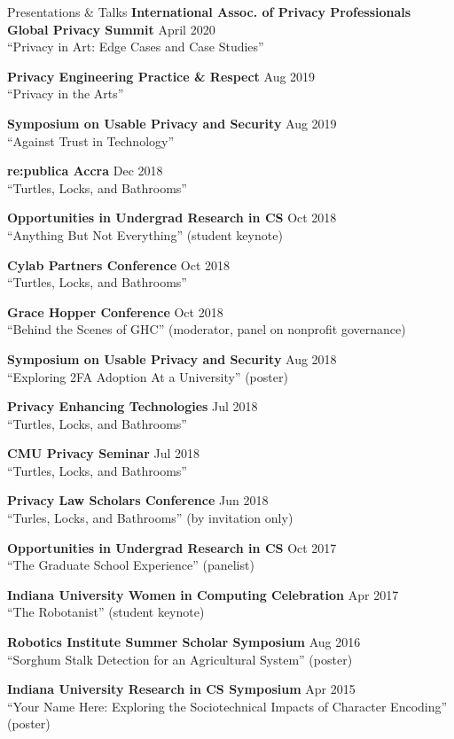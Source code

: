 \documentclass{resume} %
\begin{document}
\begin{rSection}{Presentations \& Talks}
	{\bf International Assoc. of Privacy Professionals Global Privacy Summit} \hfill April 2020 \\
		``Privacy in Art: Edge Cases and Case Studies''
	
	{\bf Privacy Engineering Practice \& Respect} \hfill Aug 2019 \\
		``Privacy in the Arts'' 
		
	{\bf Symposium on Usable Privacy and Security} \hfill Aug 2019 \\
		``Against Trust in Technology'' 
	
	{\bf re:publica Accra} \hfill Dec 2018 \\
		``Turtles, Locks, and Bathrooms'' 

	{\bf Opportunities in Undergrad Research in CS} \hfill Oct 2018 \\ 
		``Anything But Not Everything'' (student keynote)

	{\bf Cylab Partners Conference}  \hfill Oct 2018 \\ 
		``Turtles, Locks, and Bathrooms''

	{\bf Grace Hopper Conference} \hfill Oct 2018 \\ 
		``Behind the Scenes of GHC'' (moderator, panel on nonprofit governance)

	{\bf Symposium on Usable Privacy and Security} \hfill Aug 2018 \\ 
		``Exploring 2FA Adoption At a University'' (poster) 

	{\bf Privacy Enhancing Technologies} \hfill Jul 2018 \\ 
		``Turtles, Locks, and Bathrooms'' 

	{\bf CMU Privacy Seminar}  \hfill Jul 2018 \\ 
		``Turtles, Locks, and Bathrooms''

	{\bf Privacy Law Scholars Conference} \hfill Jun 2018 \\ 
		``Turles, Locks, and Bathrooms'' (by invitation only) 

	{\bf Opportunities in Undergrad Research in CS} \hfill Oct 2017 \\ 
		``The Graduate School Experience'' (panelist) \

	{\bf Indiana University Women in Computing Celebration} \hfill Apr 2017 \\ 
		``The Robotanist'' (student keynote) 

	{\bf Robotics Institute Summer Scholar Symposium} \hfill Aug 2016 \\ 
		``Sorghum Stalk Detection for an Agricultural System'' (poster) 

	{\bf Indiana University Research in CS Symposium} \hfill Apr 2015 \\
		``Your Name Here: Exploring the Sociotechnical Impacts of Character Encoding'' (poster)  

\end{rSection}
\end{document}
